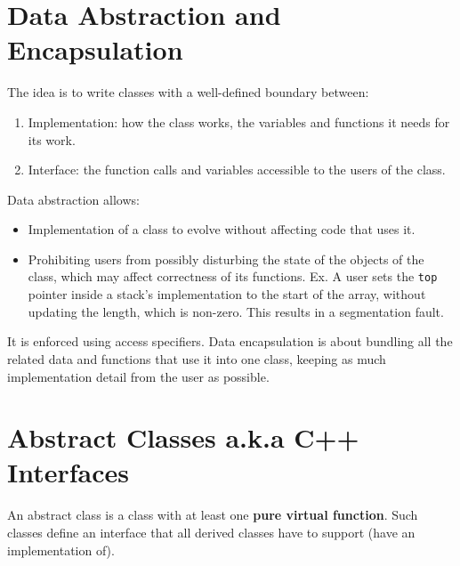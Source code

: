\documentclass{report}
\begin{document}
\section{Data Abstraction and Encapsulation}
The idea is to write classes with a well-defined boundary between:
\begin{enumerate}
\item Implementation: how the class works, the variables and functions it needs for its work.
\item Interface: the function calls and variables accessible to the users of the class.
\end{enumerate}
Data abstraction allows:
\begin{itemize}
\item Implementation of a class to evolve without affecting code that uses it.
\item Prohibiting users from possibly disturbing the state of the objects of the class,
which may affect correctness of its functions. Ex. A user sets the \texttt{top} pointer
inside a stack's implementation to the start of the array, without updating the length,
which is non-zero. This results in a segmentation fault.
\end{itemize}
It is enforced using access specifiers. Data encapsulation is about
bundling all the related data and functions that use it into one class,
keeping as much implementation detail from the user as possible.
\section{Abstract Classes a.k.a C++ Interfaces}
An abstract class is a class with at least one \textbf{pure virtual function}.
Such classes define an interface that all derived classes have to support (have an
implementation of).
\end{document}
